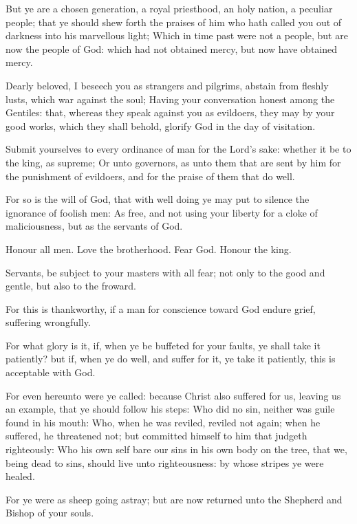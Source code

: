 \verse But ye are a chosen generation, a royal priesthood, an holy nation, a peculiar people; that ye should shew forth the praises of him who hath called you out of darkness into his marvellous light; \verse Which in time past were not a people, but are now the people of God: which had not obtained mercy, but now have obtained mercy.

\verse Dearly beloved, I beseech you as strangers and pilgrims, abstain from fleshly lusts, which war against the soul; \verse Having your conversation honest among the Gentiles: that, whereas they speak against you as evildoers, they may by your good works, which they shall behold, glorify God in the day of visitation.

\verse Submit yourselves to every ordinance of man for the Lord's sake: whether it be to the king, as supreme; \verse Or unto governors, as unto them that are sent by him for the punishment of evildoers, and for the praise of them that do well.

\verse For so is the will of God, that with well doing ye may put to silence the ignorance of foolish men: \verse As free, and not using your liberty for a cloke of maliciousness, but as the servants of God.

\verse Honour all men. Love the brotherhood. Fear God. Honour the king.

\verse Servants, be subject to your masters with all fear; not only to the good and gentle, but also to the froward.

\verse For this is thankworthy, if a man for conscience toward God endure grief, suffering wrongfully.

\verse For what glory is it, if, when ye be buffeted for your faults, ye shall take it patiently? but if, when ye do well, and suffer for it, ye take it patiently, this is acceptable with God.

\verse For even hereunto were ye called: because Christ also suffered for us, leaving us an example, that ye should follow his steps: \verse Who did no sin, neither was guile found in his mouth: \verse Who, when he was reviled, reviled not again; when he suffered, he threatened not; but committed himself to him that judgeth righteously: \verse Who his own self bare our sins in his own body on the tree, that we, being dead to sins, should live unto righteousness: by whose stripes ye were healed.

\verse For ye were as sheep going astray; but are now returned unto the Shepherd and Bishop of your souls.


